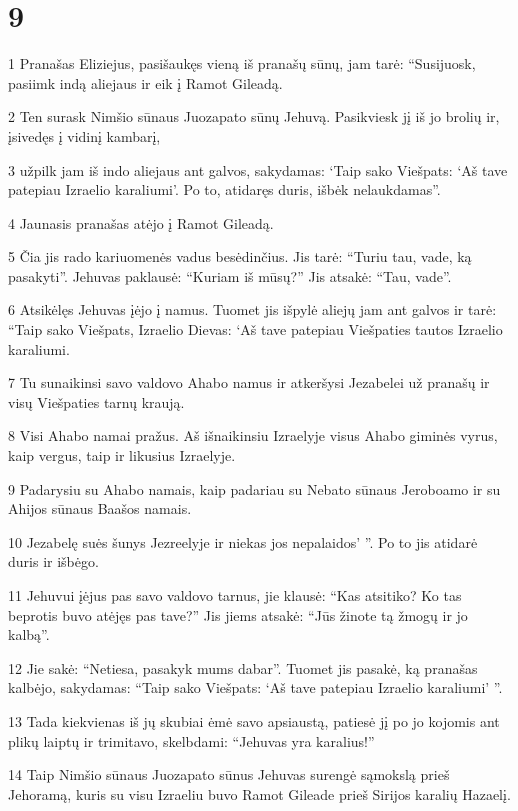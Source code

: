 \chapter{9}

\par 1 Pranašas Eliziejus, pasišaukęs vieną iš pranašų sūnų, jam tarė: “Susijuosk, pasiimk indą aliejaus ir eik į Ramot Gileadą. 
\par 2 Ten surask Nimšio sūnaus Juozapato sūnų Jehuvą. Pasikviesk jį iš jo brolių ir, įsivedęs į vidinį kambarį, 
\par 3 užpilk jam iš indo aliejaus ant galvos, sakydamas: ‘Taip sako Viešpats: ‘Aš tave patepiau Izraelio karaliumi’. Po to, atidaręs duris, išbėk nelaukdamas”. 
\par 4 Jaunasis pranašas atėjo į Ramot Gileadą. 
\par 5 Čia jis rado kariuomenės vadus besėdinčius. Jis tarė: “Turiu tau, vade, ką pasakyti”. Jehuvas paklausė: “Kuriam iš mūsų?” Jis atsakė: “Tau, vade”. 
\par 6 Atsikėlęs Jehuvas įėjo į namus. Tuomet jis išpylė aliejų jam ant galvos ir tarė: “Taip sako Viešpats, Izraelio Dievas: ‘Aš tave patepiau Viešpaties tautos Izraelio karaliumi. 
\par 7 Tu sunaikinsi savo valdovo Ahabo namus ir atkeršysi Jezabelei už pranašų ir visų Viešpaties tarnų kraują. 
\par 8 Visi Ahabo namai pražus. Aš išnaikinsiu Izraelyje visus Ahabo giminės vyrus, kaip vergus, taip ir likusius Izraelyje. 
\par 9 Padarysiu su Ahabo namais, kaip padariau su Nebato sūnaus Jeroboamo ir su Ahijos sūnaus Baašos namais. 
\par 10 Jezabelę suės šunys Jezreelyje ir niekas jos nepalaidos’ ”. Po to jis atidarė duris ir išbėgo. 
\par 11 Jehuvui įėjus pas savo valdovo tarnus, jie klausė: “Kas atsitiko? Ko tas beprotis buvo atėjęs pas tave?” Jis jiems atsakė: “Jūs žinote tą žmogų ir jo kalbą”. 
\par 12 Jie sakė: “Netiesa, pasakyk mums dabar”. Tuomet jis pasakė, ką pranašas kalbėjo, sakydamas: “Taip sako Viešpats: ‘Aš tave patepiau Izraelio karaliumi’ ”. 
\par 13 Tada kiekvienas iš jų skubiai ėmė savo apsiaustą, patiesė jį po jo kojomis ant plikų laiptų ir trimitavo, skelbdami: “Jehuvas yra karalius!” 
\par 14 Taip Nimšio sūnaus Juozapato sūnus Jehuvas surengė sąmokslą prieš Jehoramą, kuris su visu Izraeliu buvo Ramot Gileade prieš Sirijos karalių Hazaelį. 
